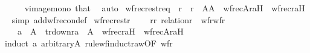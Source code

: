 \begin{isabellebody}
\ \ \ \ \isamarkupfalse%
\ vimage{\isacharunderscore}{\kern0pt}mono\ that\ \isamarkupfalse%
\ auto\isanewline
{}\isamarkupfalse%
%
\endisatagproof
{\isafoldproof}%
%
\isadelimproof
\isanewline
%
\endisadelimproof
\isanewline
{}\isamarkupfalse%
\ wfrec{\isacharunderscore}{\kern0pt}restr{\isacharunderscore}{\kern0pt}eq\ {\isacharcolon}{\kern0pt}\ {\isachardoublequoteopen}r{\isacharprime}{\kern0pt}\ {\isacharequal}{\kern0pt}\ r\ {\isasyminter}\ A{\isasymtimes}A\ {\isasymLongrightarrow}\ wfrec{\isacharbrackleft}{\kern0pt}A{\isacharbrackright}{\kern0pt}{\isacharparenleft}{\kern0pt}r{\isacharcomma}{\kern0pt}a{\isacharcomma}{\kern0pt}H{\isacharparenright}{\kern0pt}\ {\isacharequal}{\kern0pt}\ wfrec{\isacharparenleft}{\kern0pt}r{\isacharprime}{\kern0pt}{\isacharcomma}{\kern0pt}a{\isacharcomma}{\kern0pt}H{\isacharparenright}{\kern0pt}{\isachardoublequoteclose}\isanewline
%
\isadelimproof
\ \ %
\endisadelimproof
%
\isatagproof
{}\isamarkupfalse%
{\isacharparenleft}{\kern0pt}simp\ add{\isacharcolon}{\kern0pt}wfrec{\isacharunderscore}{\kern0pt}on{\isacharunderscore}{\kern0pt}def{\isacharparenright}{\kern0pt}%
\endisatagproof
{\isafoldproof}%
%
\isadelimproof
\isanewline
%
\endisadelimproof
\isanewline
{}\isamarkupfalse%
\ wfrec{\isacharunderscore}{\kern0pt}restr\ {\isacharcolon}{\kern0pt}\isanewline
\ \ \ rr{\isacharcolon}{\kern0pt}\ {\isachardoublequoteopen}relation{\isacharparenleft}{\kern0pt}r{\isacharparenright}{\kern0pt}{\isachardoublequoteclose}\ \ wfr{\isacharcolon}{\kern0pt}{\isachardoublequoteopen}wf{\isacharparenleft}{\kern0pt}r{\isacharparenright}{\kern0pt}{\isachardoublequoteclose}\isanewline
\ \ \ \ {\isachardoublequoteopen}a\ {\isasymin}\ A\ {\isasymLongrightarrow}\ tr{\isacharunderscore}{\kern0pt}down{\isacharparenleft}{\kern0pt}r{\isacharcomma}{\kern0pt}a{\isacharparenright}{\kern0pt}\ {\isasymsubseteq}\ A\ {\isasymLongrightarrow}\ wfrec{\isacharparenleft}{\kern0pt}r{\isacharcomma}{\kern0pt}a{\isacharcomma}{\kern0pt}H{\isacharparenright}{\kern0pt}\ {\isacharequal}{\kern0pt}\ wfrec{\isacharbrackleft}{\kern0pt}A{\isacharbrackright}{\kern0pt}{\isacharparenleft}{\kern0pt}r{\isacharcomma}{\kern0pt}a{\isacharcomma}{\kern0pt}H{\isacharparenright}{\kern0pt}{\isachardoublequoteclose}\isanewline
%
\isadelimproof
%
\endisadelimproof
%
\isatagproof
{}\isamarkupfalse%
\ {\isacharparenleft}{\kern0pt}induct\ a\ arbitrary{\isacharcolon}{\kern0pt}A\ rule{\isacharcolon}{\kern0pt}wf{\isacharunderscore}{\kern0pt}induct{\isacharunderscore}{\kern0pt}raw{\isacharbrackleft}{\kern0pt}OF\ wfr{\isacharbrackright}{\kern0pt}\ {\isacharparenright}{\kern0pt}\isanewline

\end{isabellebody}
